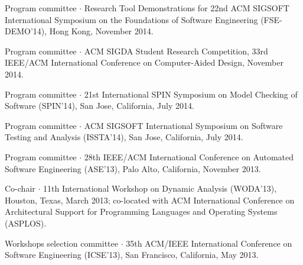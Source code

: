 \documentclass[ComputerScience]{vita}
\begin{document}
\begin{vita}
\begin{Panel and Committee Service}
\item Program committee $\cdot$ Research Tool Demonstrations for 22nd ACM
  SIGSOFT International Symposium on the Foundations of Software
  Engineering (FSE-DEMO'14), Hong Kong, November 2014.
\item Program committee $\cdot$ ACM SIGDA Student Research Competition, 33rd IEEE/ACM International Conference on Computer-Aided Design, November 2014.
\item Program committee $\cdot$ 21st International SPIN Symposium on Model Checking of Software (SPIN'14), San Jose, California, July 2014.
\item Program committee $\cdot$ ACM SIGSOFT International Symposium on Software Testing and Analysis (ISSTA'14), San Jose, California, July 2014.
\item Program committee $\cdot$ 28th IEEE/ACM International Conference on Automated Software Engineering (ASE'13), Palo Alto, California, November 2013.
\item Co-chair $\cdot$ 11th International Workshop on Dynamic Analysis (WODA'13), Houston, Texas, March 2013; co-located with ACM International Conference on Architectural Support for Programming Languages and Operating Systems (ASPLOS).
\item Workshops selection committee $\cdot$ 35th ACM/IEEE International Conference on Software Engineering (ICSE'13), San Francisco, California, May 2013.

\end{Panel and Committee Service}
\end{vita}
\end{document}
